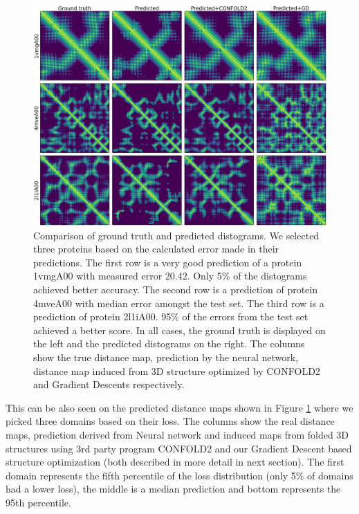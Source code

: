 \begin{figure}
    \centering
    \includegraphics[width=\linewidth]{imgs_andy/distograms/distance_maps_test_structures.png}
    \caption{Comparison of ground truth and predicted distograms. We selected three proteins based on the calculated error made in their predictions. The first row is a very good prediction of a protein 1vmgA00 with measured error 20.42. Only 5\% of the distograms achieved better accuracy. The second row is a prediction of protein 4mveA00 with median error amongst the test set. The third row is a prediction of protein 2l1iA00. 95\% of the errors from the test set achieved a better score. In all cases, the ground truth is displayed on the left and the predicted distograms on the right. The columns show the true distance map, prediction by the neural network, distance map induced from 3D structure optimized by CONFOLD2 and Gradient Descents respectively.}
    \label{fig:distograms}
\end{figure}

This can be also seen on the predicted distance maps shown in Figure \ref{fig:distograms} where we picked three domains based on their loss. The columns show the real distance maps, prediction derived from Neural network and induced maps from folded 3D structures using 3rd party program CONFOLD2 and our Gradient Descent based structure optimization (both described in more detail in next section). The first domain represents the fifth percentile of the loss distribution (only 5\% of domains had a lower loss), the middle is a median prediction and bottom represents the 95th percentile.

